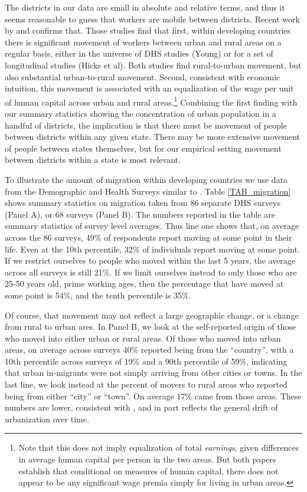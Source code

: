 \documentclass[12pt]{article}
\begin{document}
The districts in our data are small in absolute and relative terms, and thus it seems reasonable to guess that workers are mobile between districts. Recent work by \cite{young2013inequality} and \cite{hklm2017} confirms that. Those studies find that first, within developing countries there is significant movement of workers between urban and rural areas on a regular basis, either in the universe of DHS studies (Young) or for a set of longitudinal studies (Hicks et al). Both studies find rural-to-urban movement, but also substantial urban-to-rural movement. Second, consistent with economic intuition, this movement is associated with an equalization of the wage per unit of human capital across urban and rural areas.\footnote{Note that this does not imply equalization of total \textit{earnings}, given differences in average human capital per person in the two areas. But both papers establish that conditional on measures of human capital, there does not appear to be any significant wage premia simply for living in urban areas.} Combining the first finding with our summary statistics showing the concentration of urban population in a handful of districts, the implication is that there must be movement of people between districts within any given state. There may be more extensive movement of people between states themselves, but for our empirical setting movement between districts within a state is most relevant.

To illustrate the amount of migration within developing countries we use data from the Demographic and Health Surveys \citep{DHS} similar to \cite{young2013inequality}. Table \ref{TAB_migration} shows summary statistics on migration taken from 86 separate DHS surveys (Panel A), or 68 surveys (Panel B). The numbers reported in the table are summary statistics of survey level averages. Thus line one shows that, on average across the 86 surveys, 49\% of respondents report moving at some point in their life. Even at the 10th percentile, 32\% of individuals report moving at some point. If we restrict ourselves to people who moved within the last 5 years, the average across all surveys is still 21\%. If we limit ourselves instead to only those who are 25-50 years old, prime working ages, then the percentage that have moved at some point is 54\%, and the tenth percentile is 35\%.

Of course, that movement may not reflect a large geographic change, or a change from rural to urban ares. In Panel B, we look at the self-reported origin of those who moved into either urban or rural areas. Of those who moved into urban areas, on average across surveys 40\% reported being from the ``country'', with a 10th percentile across surveys of 19\% and a 90th percentile of 59\%, indicating that urban in-migrants were not simply arriving from other cities or towns. In the last line, we look instead at the percent of movers to rural areas who reported being from either ``city'' or ``town''. On average 17\% came from those areas. These numbers are lower, consistent with \cite{young2013inequality}, and in part reflects the general drift of urbanization over time.
\end{document}
